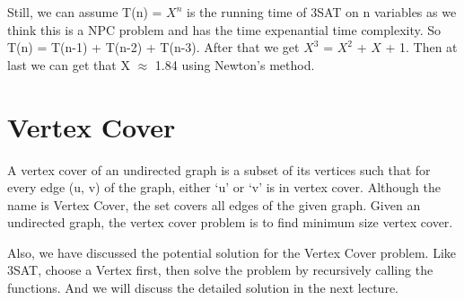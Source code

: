 \documentclass[usletter]{article}
\begin{document}
Still, we can assume T(n) = $X^n$ is the running time of 3SAT on n variables as we think this is a NPC problem and has the time expenantial time complexity. So T(n) = T(n-1) + T(n-2) + T(n-3). After that we get $X^3$ = $X^2$ + $X$ + 1. Then at last we can get that X $\approx$ 1.84 using Newton's method.

\section{Vertex Cover}
A vertex cover of an undirected graph is a subset of its vertices such that for every edge (u, v) of the graph, either ‘u’ or ‘v’ is in vertex cover. Although the name is Vertex Cover, the set covers all edges of the given graph. Given an undirected graph, the vertex cover problem is to find minimum size vertex cover.

Also, we have discussed the potential solution for the Vertex Cover problem. Like 3SAT, choose a Vertex first, then solve the problem by recursively calling the functions. And we will discuss the detailed solution in the next lecture.


\end{document}
